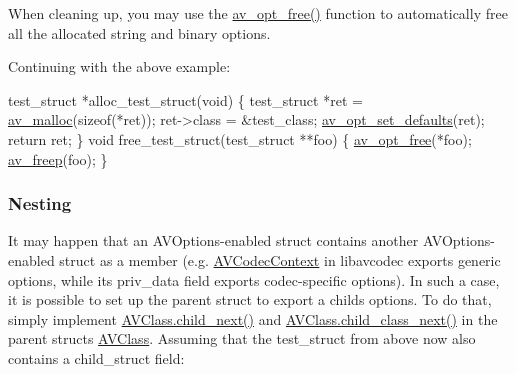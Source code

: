 When cleaning up, you may use the \hyperlink{group__avoptions_gac14db824af52baf8181406e98d116097}{av\+\_\+opt\+\_\+free()} function to automatically free all the allocated string and binary options.

Continuing with the above example\+:


\begin{DoxyCode}
test\_struct *alloc\_test\_struct(\textcolor{keywordtype}{void})
\{
    test\_struct *ret = \hyperlink{group__lavu__mem_gacbca30ebc510a7e4156d66e7aceb2dc8}{av\_malloc}(\textcolor{keyword}{sizeof}(*ret));
    ret->class = &test\_class;
    \hyperlink{group__avoptions_gad4ca968e9058b39b2da630ad0a091bdb}{av\_opt\_set\_defaults}(ret);
    \textcolor{keywordflow}{return} ret;
\}
\textcolor{keywordtype}{void} free\_test\_struct(test\_struct **foo)
\{
    \hyperlink{group__avoptions_gac14db824af52baf8181406e98d116097}{av\_opt\_free}(*foo);
    \hyperlink{group__lavu__mem_ga0cc84043ea2167ad005c86e11d0bcdba}{av\_freep}(foo);
\}
\end{DoxyCode}
\hypertarget{group__avoptions_avoptions_implement_nesting}{}\subsubsection{Nesting}\label{group__avoptions_avoptions_implement_nesting}
It may happen that an A\+V\+Options-\/enabled struct contains another A\+V\+Options-\/enabled struct as a member (e.\+g. \hyperlink{struct_a_v_codec_context}{A\+V\+Codec\+Context} in libavcodec exports generic options, while its priv\+\_\+data field exports codec-\/specific options). In such a case, it is possible to set up the parent struct to export a child\textquotesingle{}s options. To do that, simply implement \hyperlink{struct_a_v_class_a1e996ee57c93f5513281c04f68440cff}{A\+V\+Class.\+child\+\_\+next()} and \hyperlink{struct_a_v_class_af1446f94b0cfc1de453319e972eed61d}{A\+V\+Class.\+child\+\_\+class\+\_\+next()} in the parent struct\textquotesingle{}s \hyperlink{struct_a_v_class}{A\+V\+Class}. Assuming that the test\+\_\+struct from above now also contains a child\+\_\+struct field\+:


